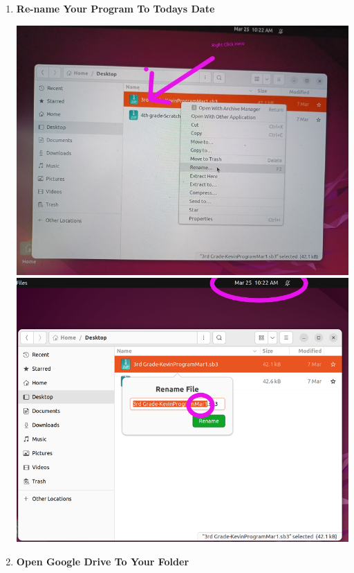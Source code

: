 \documentclass{article}
\begin{document}
\begin{enumerate}
\item {\large \textbf{Re-name Your Program To Todays Date}}

\centerline{\includegraphics[scale=.30]{4.jpg} \includegraphics[scale=.30]{5.png} }

\item {\large \textbf{Open Google Drive To Your Folder}}


\end{enumerate}
\end{document}

